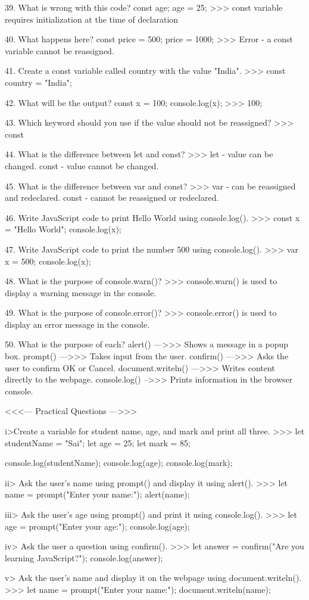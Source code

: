 39. What is wrong with this code?
    const age;
    age = 25;
    >>>  const variable requires initialization at the time of declaration

40. What happens here?
    const price = 500;
    price = 1000;
    >>> Error - a const variable cannot be reassigned.

41. Create a const variable called country with the value "India".
    >>> const country = "India";

42. What will be the output?
    const x = 100;
    console.log(x);
    >>> 100;

43. Which keyword should you use if the value should not be reassigned?
    >>> const

44. What is the difference between let and const?
    >>> let - value can be changed.
        const - value cannot be changed.

45. What is the difference between var and const?
    >>> var - can be reassigned and redeclared.
        const - cannot be reassigned or redeclared.

46. Write JavaScript code to print Hello World using console.log().
    >>> const x = "Hello World";
        console.log(x);

47. Write JavaScript code to print the number 500 using console.log().
    >>> var x = 500;
        console.log(x);

48. What is the purpose of console.warn()?
    >>> console.warn() is used to display a warning message in the console.

49. What is the purpose of console.error()?
    >>> console.error() is used to display an error message in the console.

50. What is the purpose of each?
    alert() --->>> Shows a message in a popup box.
    prompt() --->>> Takes input from the user.
    confirm() --->>> Asks the user to confirm OK or Cancel.
    document.writeln() --->>> Writes content directly to the webpage.
    console.log() -->>> Prints information in the browser console.

<<<--- Practical Questions --->>>

i>Create a variable for student name, age, and mark and print all three.
    >>> let studentName = "Sai";
        let age = 25;
        let mark = 85;

        console.log(studentName);
        console.log(age);
        console.log(mark);

ii> Ask the user's name using prompt() and display it using alert().
    >>> let name = prompt("Enter your name:");
        alert(name);

iii> Ask the user's age using prompt() and print it using console.log().
    >>> let age = prompt("Enter your age:");
        console.log(age);

iv> Ask the user a question using confirm().
    >>> let answer = confirm("Are you learning JavaScript?");
        console.log(answer);

v> Ask the user's name and display it on the webpage using document.writeln().
    >>> let name = prompt("Enter your name:");
    document.writeln(name);

